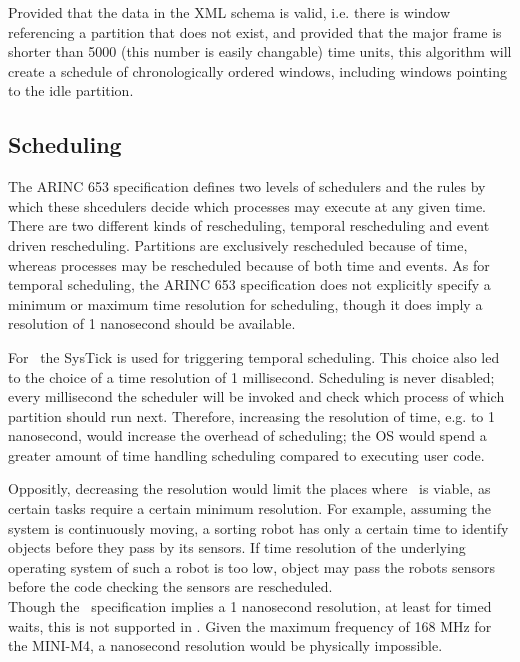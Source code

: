Provided that the data in the XML schema is valid, i.e. there is window 
referencing a partition that does not exist, and provided that the major frame
is shorter than 5000 (this number is easily changable) time units, this
algorithm will create a schedule of chronologically ordered windows, including
windows pointing to the idle partition.

\subsection{Scheduling}
The ARINC 653 specification defines two levels of schedulers and the rules by
which these shcedulers decide which processes may execute at any given time.
There are two different kinds of rescheduling, temporal rescheduling and event
driven rescheduling. Partitions are exclusively rescheduled because of time,
whereas processes may be rescheduled because of both time and events.
As for temporal scheduling, the ARINC 653 specification does not explicitly
specify a minimum or maximum time resolution for scheduling, though it does
imply a resolution of 1 nanosecond should be available\cite{arinc_time_resolution}.

For \OSname\ the SysTick is used for triggering temporal scheduling. This choice
also led to the choice of a time resolution of 1 millisecond. Scheduling is
never disabled; every millisecond the scheduler will be invoked and check which
process of which partition should run next. Therefore, increasing the resolution
of time, e.g. to 1 nanosecond, would increase the overhead of scheduling; the OS
would spend a greater amount of time handling scheduling compared to executing
user code.

Oppositly, decreasing the resolution would limit the places where \OSname\ is
viable, as certain tasks require a certain minimum resolution. For example,
assuming the system is continuously moving, a sorting robot has only a certain
time to identify objects before they pass by its sensors. If time resolution of
the underlying operating system of such a robot is too low, object may pass the
robots sensors before the code checking the sensors are rescheduled.\\

Though the \arinc\ specification implies a 1 nanosecond resolution, at least for
timed waits, this is not supported in \OSname . Given the maximum frequency of
168 MHz for the MINI-M4, a nanosecond resolution would be physically impossible.\\


